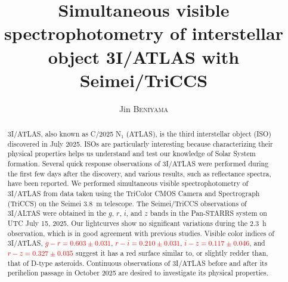 \documentclass[]{pasj02}
\newcommand{\RED}[1]{\textcolor{red}{#1}}
\newcommand\gr{\RED{$g-r=0.603\pm0.031$}\xspace}
\newcommand\ri{\RED{$r-i=0.210\pm0.031$}\xspace}
\newcommand\iz{\RED{$i-z=0.117\pm0.046$}\xspace}
\newcommand\rz{\RED{$r-z=0.327\pm0.035$}\xspace}
\begin{document}
 

\title{Simultaneous visible spectrophotometry of interstellar object 3I/ATLAS with Seimei/TriCCS}

\author{
Jin \textsc{Beniyama}\altemailmark{}  
}


\maketitle

\begin{abstract}
3I/ATLAS, also known as C/2025 N$_1$ (ATLAS), is the third interstellar object (ISO) discovered in July 2025.
ISOs are particularly interesting because characterizing their physical properties helps us understand and test our knowledge of Solar System formation.
Several quick response observations of 3I/ATLAS were performed during the first few days after the discovery, and various results, such as reflectance spectra, have been reported.
We performed simultaneous visible spectrophotometry of 3I/ATLAS from data taken using the TriColor CMOS Camera and Spectrograph (TriCCS) on the Seimei 3.8~m telescope.
The Seimei/TriCCS observations of 3I/ALTAS were obtained in the $g$, $r$, $i$, and $z$ bands in the Pan-STARRS system on UTC July 15, 2025.
Our lightcurves show no significant variations during the 2.3~h observation, which is in good agreement with previous studies.
Visible color indices of 3I/ATLAS, \gr, \ri, \iz, and \rz suggest it has a red surface similar to, or slightly redder than, that of D-type asteroids.
Continuous observations of 3I/ATLAS before and after its perihelion passage in October 2025 are desired to investigate its physical properties.
\end{abstract}

\pagewiselinenumbers 
\clearpage
\end{document}
